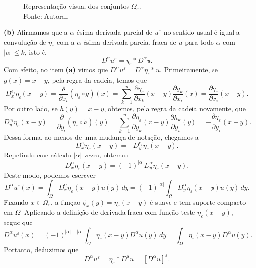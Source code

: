 \begin{prf}
    \begin{figure}
        \centering
        
        \caption{Representação visual dos conjuntos $\Omega_\varepsilon$.\\Fonte: Autoral.}
    \end{figure}

    \textbf{(b)} Afirmamos que a $\alpha$-ésima derivada parcial de $u^\varepsilon$ no sentido usual é igual a convulução de $\eta_\varepsilon$ com a $\alpha$-ésima derivada parcial fraca de $u$ para todo $\alpha$ com $|\alpha| \leqslant k$, isto é,
    \[
        D^\alpha u^\varepsilon = \eta_\varepsilon * D^\alpha u.
    \]
    Com efeito, no item \textbf{(a)} vimos que $D^\alpha u^\varepsilon = D^\alpha \eta_\varepsilon * u$. Primeiramente, se $g(x) = x - y$, pela regra da cadeia, temos que
    \[
        D^{e_i}_x \eta_\varepsilon (x -y) = \dfrac{\partial}{\partial x_i} (\eta_\varepsilon \circ g)(x) = \sum_{k=1}^n \dfrac{\partial \eta_\varepsilon}{\partial x_k} (x - y) \dfrac{\partial g_k}{\partial x_i}(x) = \dfrac{\partial \eta_\varepsilon}{\partial x_i}(x-y).
    \]
    Por outro lado, se $h(y) = x - y$, obtemos, pela regra da cadeia novamente, que
    \[
        D^{e_i}_y \eta_\varepsilon (x-y) = \dfrac{\partial}{\partial y_i} (\eta_\varepsilon \circ h)(y) = \sum_{k=1}^n \dfrac{\partial \eta_\varepsilon}{\partial y_k} (x - y) \dfrac{\partial h_k}{\partial y_i}(y) = -\dfrac{\partial \eta_\varepsilon}{\partial y_i}(x-y).
    \]
    Dessa forma, ao menos de uma mudança de notação, chegamos a
    \[
        D^{e_i}_x \eta_\varepsilon (x-y) = -D^{e_i}_y \eta_\varepsilon (x-y).
    \]
    Repetindo esse cálculo $|\alpha|$ vezes, obtemos
    \[
        D^\alpha_x \eta_\varepsilon (x-y) = (-1)^{|\alpha|} D^\alpha_y \eta_\varepsilon (x-y).
    \]
    Deste modo, podemos escrever
    \[
        D^{\alpha} u^\varepsilon (x) = \int_\Omega D^\alpha_x \eta_\varepsilon (x-y) u(y) \,dy = (-1)^{|\alpha|} \int_\Omega D^{\alpha}_y \eta_\varepsilon (x-y) u(y) \,dy.
    \]
    Fixando $x \in \Omega_\varepsilon$, a função $\phi_x(y) =\eta_\varepsilon(x-y)$ é suave e tem suporte compacto em $\Omega$.
    Aplicando a definição de derivada fraca com função teste $\eta_\varepsilon(x-y)$, segue que
    \[
        D^\alpha u^\varepsilon(x) = (-1)^{|\alpha| + |\alpha|}  \int_\Omega \eta_\varepsilon(x-y) D^{\alpha} u(y) \,dy = \int_\Omega \eta_\varepsilon(x-y) D^\alpha u(y).
    \]
    Portanto, deduzimos que
    \begin{equation}
        D^\alpha u^\varepsilon = \eta_\varepsilon * D^\alpha u = [D^\alpha u]^\varepsilon.
    \end{equation}


\end{prf}
